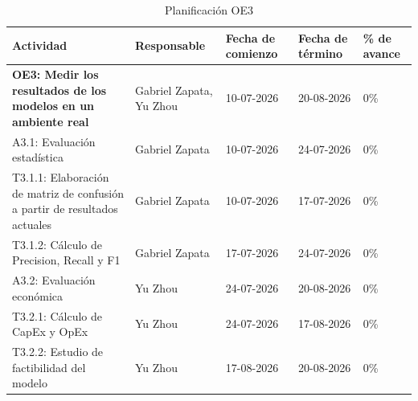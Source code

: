 \documentclass[12pt,a4paper]{article}
\begin{document}
    \begin{table}[H]
            \centering
            \renewcommand{\arraystretch}{1.5}
            \begin{tabular}{|p{5cm}|p{3cm}|p{2cm}|p{2cm}|p{2cm}|}
            \hline
            \textbf{Actividad} & \textbf{Responsable} & \textbf{Fecha de comienzo} & \textbf{Fecha de término} & \textbf{\% de avance} \\ \hline
            \textbf{OE3: Medir los resultados de los modelos en un ambiente real} & Gabriel Zapata, Yu Zhou & 10-07-2026 & 20-08-2026 & 0\% \\ \hline
            A3.1: Evaluación estadística & Gabriel Zapata & 10-07-2026 & 24-07-2026 & 0\% \\ \hline
            T3.1.1: Elaboración de matriz de confusión a partir de resultados actuales & Gabriel Zapata & 10-07-2026 & 17-07-2026 & 0\% \\ \hline
            T3.1.2: Cálculo de Precision, Recall y F1 & Gabriel Zapata & 17-07-2026 & 24-07-2026 & 0\% \\ \hline
            A3.2: Evaluación económica & Yu Zhou & 24-07-2026 & 20-08-2026 & 0\% \\ \hline
            T3.2.1: Cálculo de CapEx y OpEx & Yu Zhou & 24-07-2026 & 17-08-2026 & 0\% \\ \hline
            T3.2.2: Estudio de factibilidad del modelo & Yu Zhou & 17-08-2026 & 20-08-2026 & 0\% \\ \hline
            \end{tabular}
            \caption{Planificación OE3}
            \label{tab:planificacion_avance_oe3}
    \end{table}
\end{document}
